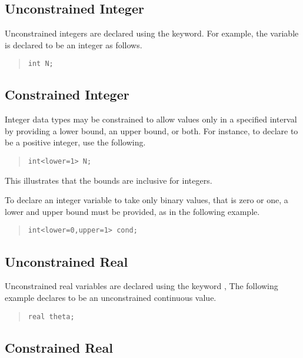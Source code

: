 \subsection{Unconstrained Integer}

Unconstrained integers are declared using the  keyword.
For example, the variable  is declared to be an integer as follows.
%
\begin{quote}
\begin{Verbatim} 
int N;
\end{Verbatim}
\end{quote}
% 

\subsection{Constrained Integer}

Integer data types may be constrained to allow values only in a
specified interval by providing a lower bound, an upper bound, or
both.  For instance, to declare  to be a positive integer, use
the following.
%
\begin{quote}
\begin{Verbatim}
int<lower=1> N;
\end{Verbatim}
\end{quote}
%
This illustrates that the bounds are inclusive for integers.

To declare an integer variable  to take only binary values,
that is zero or one, a lower and upper bound must be provided, as in
the following example.
%
\begin{quote}
\begin{Verbatim} 
int<lower=0,upper=1> cond;
\end{Verbatim}
\end{quote}


\subsection{Unconstrained Real}

Unconstrained real variables are declared using the keyword
, The following example declares  to be an
unconstrained continuous value.
%
\begin{quote}
\begin{Verbatim}
real theta;
\end{Verbatim}
\end{quote}
%

\subsection{Constrained Real}

